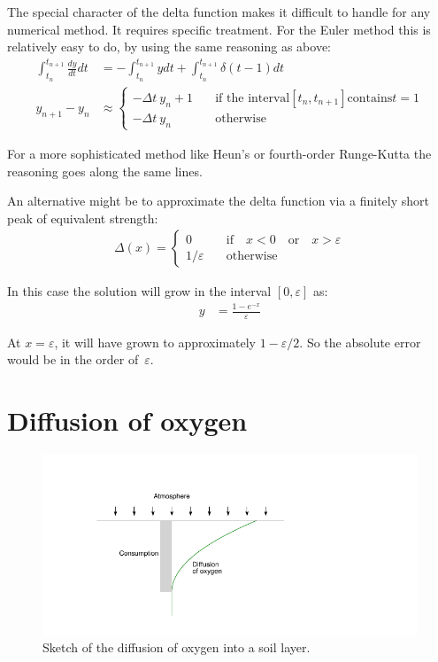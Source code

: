 \documentclass[onecolumn]{article}
\begin{document}
The special character of the delta function makes it difficult to handle for any numerical method. It
requires specific treatment. For the Euler method this is relatively easy to do, by using the same
reasoning as above:
%
\begin{align}
            \int_{t_n}^{t_{n+1}} \frac{dy}{dt} dt &=        - \int_{t_n}^{t_{n+1}} y dt + \int_{t_n}^{t_{n+1}} \delta(t-1) dt \\
\nonumber         y_{n+1} - y_n                   &\approx
                  \begin{cases}
                  - \Delta t ~ y_n + 1  & \quad \text{if the interval} [t_n,t_{n+1}] \text{contains} t = 1 \\
                  - \Delta t ~ y_n      & \quad \text{otherwise}
                  \end{cases}
\end{align}

For a more sophisticated method like Heun's or fourth-order Runge-Kutta the reasoning goes
along the same lines.

An alternative might be to approximate the delta function via a finitely short peak of equivalent strength:
%
\begin{align}
          \Delta(x)  =
           \begin{cases}
           0             & \quad \text{if} \quad x < 0 \quad \text{or} \quad x > \varepsilon \\
           1/\varepsilon & \quad \text{otherwise}
           \end{cases}
\end{align}

In this case the solution will grow in the interval $[0,\varepsilon]$ as:
\begin{align}
     y &= \frac{1 - e^{-x}}{\varepsilon}
\end{align}

At $x = \varepsilon$, it will have grown to approximately $1 - \varepsilon/2$. So the absolute error would be
in the order of~$\varepsilon$.

\section*{Diffusion of oxygen}

\begin{figure}
\begin{center}
\includegraphics{diffusion.pdf}
\caption{Sketch of the diffusion of oxygen into a soil layer.}
\label{diffusionSketch}
\end{center}
\end{figure}
\end{document}
